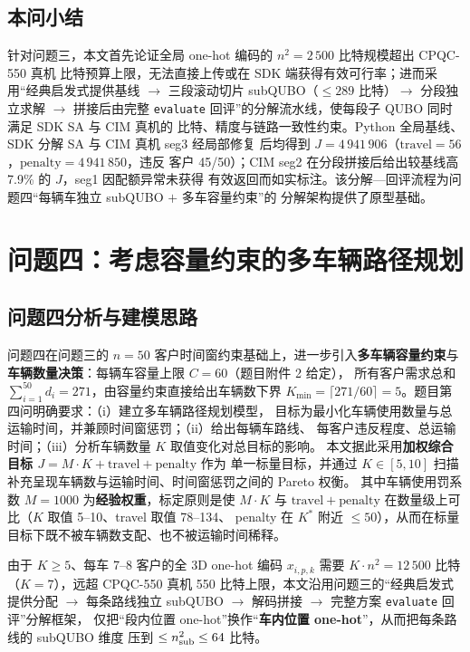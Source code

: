 \documentclass[UTF8,12pt,a4paper]{ctexart}
\begin{document}
\subsection{本问小结}

针对问题三，本文首先论证全局 one-hot 编码的 $n^{2}=2\,500$ 比特规模超出 CPQC-550 真机
比特预算上限，无法直接上传或在 SDK 端获得有效可行率；进而采用``经典启发式提供基线
$\to$ 三段滚动切片 subQUBO（$\le 289$ 比特）$\to$ 分段独立求解 $\to$ 拼接后由完整
\texttt{evaluate} 回评''的分解流水线，使每段子 QUBO 同时满足 SDK SA 与 CIM 真机的
比特、精度与链路一致性约束。Python 全局基线、SDK 分解 SA 与 CIM 真机 seg3 经局部修复
后均得到 $J=4\,941\,906$（$\mathrm{travel}=56$，$\mathrm{penalty}=4\,941\,850$，违反
客户 45/50）；CIM seg2 在分段拼接后给出较基线高 7.9\% 的 $J$，seg1 因配额异常未获得
有效返回而如实标注。该分解—回评流程为问题四``每辆车独立 subQUBO $+$ 多车容量约束''的
分解架构提供了原型基础。

\section{问题四：考虑容量约束的多车辆路径规划}
\label{sec:q4}

\subsection{问题四分析与建模思路}
\label{subsec:q4-analysis}

问题四在问题三的 $n=50$ 客户时间窗约束基础上，进一步引入\textbf{多车辆容量约束}与
\textbf{车辆数量决策}：每辆车容量上限 $C=60$（题目附件 2 给定），
所有客户需求总和 $\sum_{i=1}^{50}d_i=271$，由容量约束直接给出车辆数下界
$K_{\min}=\lceil 271/60\rceil=5$。题目第四问明确要求：（i）建立多车辆路径规划模型，
目标为最小化车辆使用数量与总运输时间，并兼顾时间窗惩罚；（ii）给出每辆车路线、
每客户违反程度、总运输时间；（iii）分析车辆数量 $K$ 取值变化对总目标的影响。
本文据此采用\textbf{加权综合目标 $J=M\!\cdot\!K+\mathrm{travel}+\mathrm{penalty}$} 作为
单一标量目标，并通过 $K\in[5,10]$ 扫描补充呈现车辆数与运输时间、时间窗惩罚之间的 Pareto 权衡。
其中车辆使用罚系数 $M=1000$ 为\textbf{经验权重}，标定原则是使 $M\!\cdot\!K$ 与
$\mathrm{travel}+\mathrm{penalty}$ 在数量级上可比（$K$ 取值 5--10、travel 取值 78--134、
penalty 在 $K^*$ 附近 $\le 50$），从而在标量目标下既不被车辆数支配、也不被运输时间稀释。

由于 $K\ge 5$、每车 7--8 客户的全 3D one-hot 编码 $x_{i,p,k}$ 需要 $K\!\cdot\!n^2=12\,500$
比特（$K=7$），远超 CPQC-550 真机 550 比特上限，本文沿用问题三的``经典启发式提供分配 $\to$
每条路线独立 subQUBO $\to$ 解码拼接 $\to$ 完整方案 \texttt{evaluate} 回评''分解框架，
仅把``段内位置 one-hot''换作``\textbf{车内位置 one-hot}''，从而把每条路线的 subQUBO 维度
压到 $\le n_{\rm sub}^2\le 64$ 比特。
\end{document}
